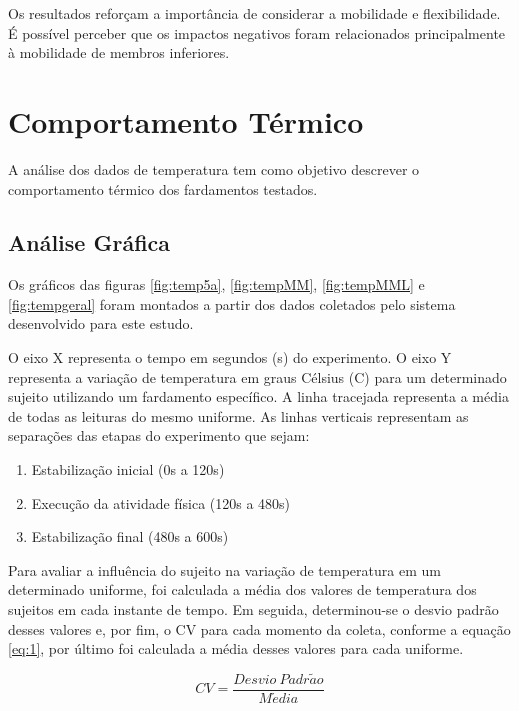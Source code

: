         \tab Os resultados reforçam a importância de considerar a mobilidade e flexibilidade. 
        É possível perceber que os impactos negativos foram relacionados principalmente à 
        mobilidade de membros inferiores.

\section{Comportamento Térmico}
    A análise dos dados de temperatura tem como objetivo descrever o comportamento térmico 
    dos fardamentos testados.

    \subsection{Análise Gráfica}
        Os gráficos das figuras \ref{fig:temp5a}, \ref{fig:tempMM}, \ref{fig:tempMML} e \ref{fig:tempgeral} foram montados
        a partir dos dados coletados pelo sistema desenvolvido para este estudo. 

        O eixo X representa o tempo em segundos (s) do experimento. O eixo Y representa a variação de temperatura em graus Célsius (\degree C) para um 
        determinado sujeito utilizando um fardamento específico. A linha tracejada representa a 
        média de todas as leituras do mesmo uniforme. As linhas verticais representam as separações das etapas
        do experimento que sejam: 
        \begin{enumerate}[label=\Roman*.] %
            \item Estabilização inicial (0s a 120s)
            \item Execução da atividade física (120s a 480s)
            \item Estabilização final (480s a 600s)
            \end{enumerate}
        

        Para avaliar a influência do sujeito na variação de temperatura em um determinado uniforme, foi 
        calculada a média dos valores de temperatura dos sujeitos em cada instante de tempo. Em seguida, 
        determinou-se o desvio padrão desses valores e, por fim, o \acrlong{CV} para cada momento da 
        coleta, conforme a equação \ref{eq:1}, por último foi calculada a média desses valores para cada 
        uniforme.

        \begin{equation} 
            \label{eq:1}CV=\frac{Desvio~Padr\tilde{a}o}{M\acute{e}dia}
            \end{equation}

